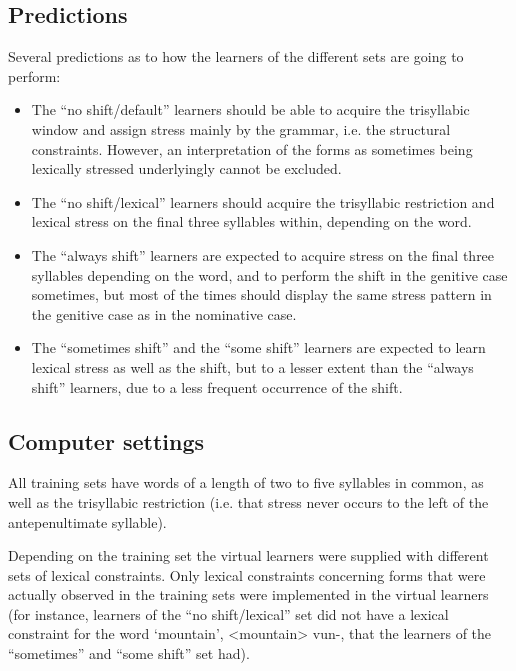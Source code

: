 \documentclass[a4paper]{article}
\begin{document}
\subsection{
Predictions}

Several predictions as to how the learners of the different sets are going to perform:

\begin{itemize}
\item
{
The “no shift/default” learners should be able to acquire the trisyllabic window and assign stress mainly by the grammar, i.e. the structural constraints. However, an interpretation of the forms as sometimes being lexically stressed underlyingly cannot be excluded.}
\item
{
The “no shift/lexical” learners should acquire the trisyllabic restriction and lexical stress on the final three syllables within, depending on the word.}
\item
{
The “always shift” learners are expected to acquire stress on the final three syllables depending on the word, and to perform the shift in the genitive case sometimes, but most of the times should display the same stress pattern in the genitive case as in the nominative case.}
\item
{
The “sometimes shift” and the “some shift” learners are expected to learn lexical stress as well as the shift, but to a lesser extent than the “always shift” learners, due to a less frequent occurrence of the shift.}
\end{itemize}

\subsection{
Computer settings}

All training sets have words of a length of two to five syllables in common, as well as the trisyllabic restriction (i.e. that stress never occurs to the left of the antepenultimate syllable).

Depending on the training set the virtual learners were supplied with different sets of lexical constraints. Only lexical constraints concerning forms that were actually observed in the training sets were implemented in the virtual learners (for instance, learners of the “no shift/lexical” set did not have a lexical constraint for the word ‘mountain’, {\textless}mountain{\textgreater} {\textbar}vun-{\textbar}, that the learners of the “sometimes” and “some shift” set had).
\end{document}
